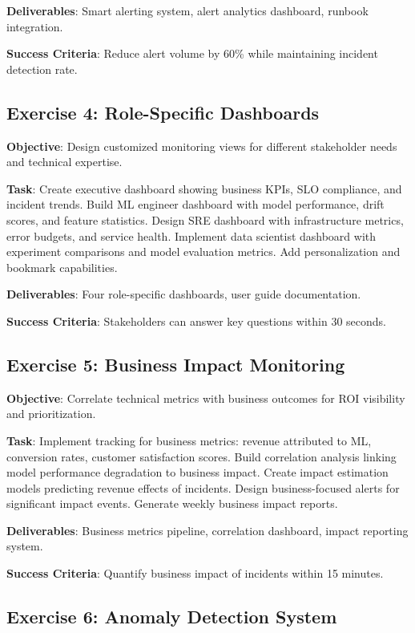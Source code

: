 \textbf{Deliverables}: Smart alerting system, alert analytics dashboard, runbook integration.

\textbf{Success Criteria}: Reduce alert volume by 60\% while maintaining incident detection rate.

\subsection{Exercise 4: Role-Specific Dashboards}

\textbf{Objective}: Design customized monitoring views for different stakeholder needs and technical expertise.

\textbf{Task}: Create executive dashboard showing business KPIs, SLO compliance, and incident trends. Build ML engineer dashboard with model performance, drift scores, and feature statistics. Design SRE dashboard with infrastructure metrics, error budgets, and service health. Implement data scientist dashboard with experiment comparisons and model evaluation metrics. Add personalization and bookmark capabilities.

\textbf{Deliverables}: Four role-specific dashboards, user guide documentation.

\textbf{Success Criteria}: Stakeholders can answer key questions within 30 seconds.

\subsection{Exercise 5: Business Impact Monitoring}

\textbf{Objective}: Correlate technical metrics with business outcomes for ROI visibility and prioritization.

\textbf{Task}: Implement tracking for business metrics: revenue attributed to ML, conversion rates, customer satisfaction scores. Build correlation analysis linking model performance degradation to business impact. Create impact estimation models predicting revenue effects of incidents. Design business-focused alerts for significant impact events. Generate weekly business impact reports.

\textbf{Deliverables}: Business metrics pipeline, correlation dashboard, impact reporting system.

\textbf{Success Criteria}: Quantify business impact of incidents within 15 minutes.

\subsection{Exercise 6: Anomaly Detection System}

